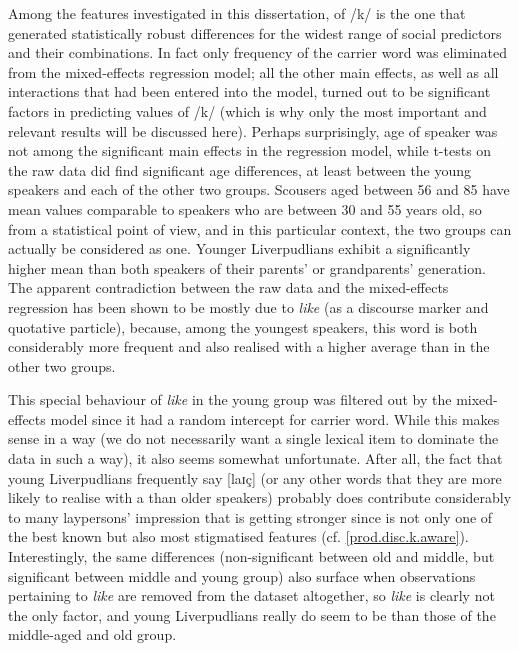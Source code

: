 Among the features investigated in this dissertation,  of /k/ is the one that generated statistically robust differences for the widest range of social predictors and their combinations.
In fact only frequency of the carrier word was eliminated from the mixed-effects regression model; all the other main effects, as well as all interactions that had been entered into the model, turned out to be significant factors in predicting  values of /k/ (which is why only the most important and relevant results will be discussed here).
Perhaps surprisingly, age of speaker was not among the significant main effects in the regression model, while t-tests on the raw data did find significant age differences, at least between the young speakers and each of the other two groups.
Scousers aged between 56 and 85 have mean  values comparable to speakers who are between 30 and 55 years old, so from a statistical point of view, and in this particular context, the two groups can actually be considered as one.
Younger Liverpudlians exhibit a significantly higher mean  than both speakers of their parents' or grandparents' generation.
The apparent contradiction between the raw data and the mixed-effects regression has been shown to be mostly due to \emph{like} (as a discourse marker and quotative particle), because, among the youngest speakers, this word is both considerably more frequent and also realised with a higher average  than in the other two groups. 

This special behaviour of \emph{like} in the young group was filtered out by the mixed-effects model since it had a random intercept for carrier word.
While this makes sense in a way (we do not necessarily want a single lexical item to dominate the data in such a way), it also seems somewhat unfortunate.
After all, the fact that young Liverpudlians frequently say [laɪç] (or any other words that they are more likely to realise with a  than older speakers) probably does contribute considerably to many laypersons' impression that  is getting stronger since  is not only one of the best known but also most stigmatised features (cf. \ref{prod.disc.k.aware}).
Interestingly, the same differences (non-significant between old and middle, but significant between middle and young group) also surface when observations pertaining to \emph{like} are removed from the dataset altogether, so \emph{like} is clearly not the only factor, and young Liverpudlians really do seem to be  than those of the middle-aged and old group.

